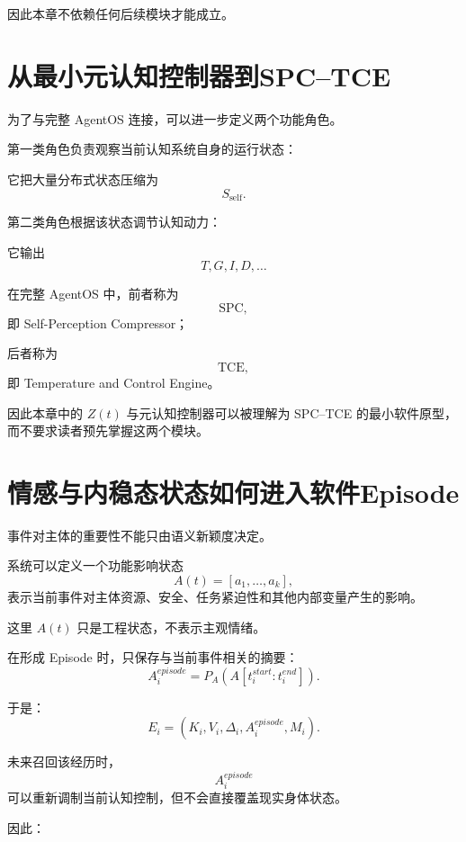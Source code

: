 因此本章不依赖任何后续模块才能成立。

\section{从最小元认知控制器到SPC--TCE}

为了与完整 AgentOS 连接，可以进一步定义两个功能角色。

第一类角色负责观察当前认知系统自身的运行状态：
\begin{statementbox}
\centering
{}
\end{statementbox}

它把大量分布式状态压缩为
\[
S_{\mathrm{self}}.
\]

第二类角色根据该状态调节认知动力：
\begin{statementbox}
\centering
{}
\end{statementbox}

它输出
\[
T,
G,
I,
D,
\ldots
\]

在完整 AgentOS 中，前者称为
\[
\mathrm{SPC},
\]
即 Self-Perception Compressor；

后者称为
\[
\mathrm{TCE},
\]
即 Temperature and Control Engine。

因此本章中的 $Z(t)$ 与元认知控制器可以被理解为 SPC--TCE 的最小软件原型，而不要求读者预先掌握这两个模块。

\section{情感与内稳态状态如何进入软件Episode}

事件对主体的重要性不能只由语义新颖度决定。

系统可以定义一个功能影响状态
\[
A(t)
=
[
a_1,\ldots,a_k
],
\]
表示当前事件对主体资源、安全、任务紧迫性和其他内部变量产生的影响。

这里 $A(t)$ 只是工程状态，不表示主观情绪。

在形成 Episode 时，只保存与当前事件相关的摘要：
\[
A_i^{episode}
=
P_A(A[t_i^{start}:t_i^{end}]).
\]

于是：
\[
E_i
=
(
K_i,
V_i,
\Delta_i,
A_i^{episode},
M_i
).
\]

未来召回该经历时，
\[
A_i^{episode}
\]
可以重新调制当前认知控制，但不会直接覆盖现实身体状态。

因此：
\begin{statementbox}
\centering
{}
\end{statementbox}

